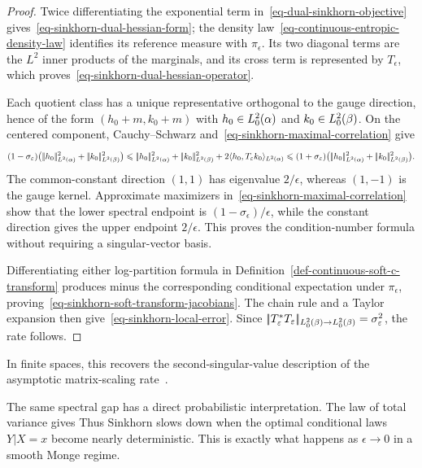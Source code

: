 \begin{proof}
	Twice differentiating the exponential term in~\eqref{eq-dual-sinkhorn-objective} gives~\eqref{eq-sinkhorn-dual-hessian-form}; the density law~\eqref{eq-continuous-entropic-density-law} identifies its reference measure with $\pi_\epsilon$. Its two diagonal terms are the $L^2$ inner products of the marginals, and its cross term is represented by $T_\epsilon$, which proves~\eqref{eq-sinkhorn-dual-hessian-operator}.

	Each quotient class has a unique representative orthogonal to the gauge direction, hence of the form
	\(
		(h_0+m,k_0+m)
	\)
	with $h_0\in L_0^2(\alpha)$ and $k_0\in L_0^2(\beta)$. On the centered component, Cauchy--Schwarz and~\eqref{eq-sinkhorn-maximal-correlation} give
	\[
		(1-\sigma_\epsilon)
		\bigl(\norm{h_0}_{L^2(\al)}^2+\norm{k_0}_{L^2(\be)}^2\bigr)
		\leq
		\norm{h_0}_{L^2(\al)}^2+\norm{k_0}_{L^2(\be)}^2
		+2\langle h_0,T_\epsilon k_0\rangle_{L^2(\al)}
		\leq
		(1+\sigma_\epsilon)
		\bigl(\norm{h_0}_{L^2(\al)}^2+\norm{k_0}_{L^2(\be)}^2\bigr).
	\]
	The common-constant direction $(1,1)$ has eigenvalue $2/\epsilon$, whereas $(1,-1)$ is the gauge kernel. Approximate maximizers in~\eqref{eq-sinkhorn-maximal-correlation} show that the lower spectral endpoint is $(1-\sigma_\epsilon)/\epsilon$, while the constant direction gives the upper endpoint $2/\epsilon$. This proves the condition-number formula without requiring a singular-vector basis.

	Differentiating either log-partition formula in Definition~\ref{def-continuous-soft-c-transform} produces minus the corresponding conditional expectation under $\pi_\epsilon$, proving~\eqref{eq-sinkhorn-soft-transform-jacobians}. The chain rule and a Taylor expansion then give~\eqref{eq-sinkhorn-local-error}. Since
	\(|\!| T_\varepsilon^*T_\varepsilon |\!|_{L_0^2(\beta)\to L_0^2(\beta)}
	=\sigma_\varepsilon^2\),
	the rate follows.
\end{proof}

In finite spaces, this recovers the second-singular-value description of the asymptotic matrix-scaling rate~\cite{knight2008sinkhorn,lehmann2022overrelaxation}.

The same spectral gap has a direct probabilistic interpretation. The law of total variance gives
Thus Sinkhorn slows down when the optimal conditional laws $Y|X=x$ become nearly deterministic. This is exactly what happens as $\epsilon\to0$ in a smooth Monge regime.

